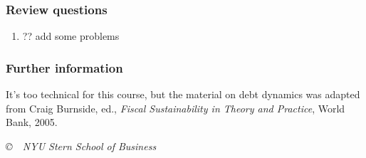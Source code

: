 \documentclass[letterpaper,12pt]{article}
\begin{document}
\subsubsection*{Review questions}

\begin{enumerate}

\item ?? add some problems 

\end{enumerate}


\subsubsection*{Further information}

It's too technical for this course, 
but the material on debt dynamics was adapted from 
Craig Burnside, ed., {\it Fiscal Sustainability in Theory and Practice\/}, 
World Bank, 2005.  


\vfill \centerline{\it \copyright \ \number\year \  
NYU Stern School of Business}
\end{document}
